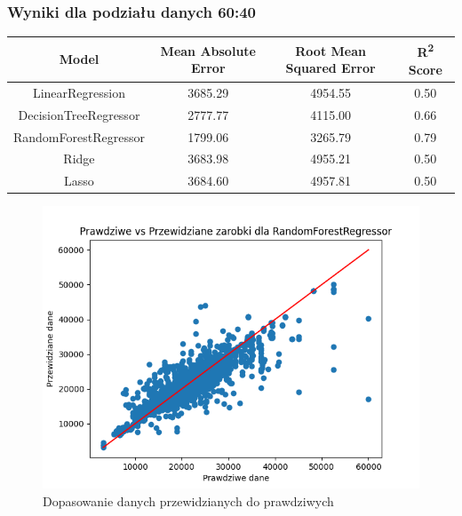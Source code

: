 \documentclass[a4paper]{article}
\begin{document}
\subsubsection{Wyniki dla podziału danych 60:40}

\begin{table}[H]
    \centering
    \begin{tabular}{|c|c|c|c|}
        \hline
        \textbf{Model}        & \textbf{Mean Absolute Error} & \textbf{Root Mean Squared Error} & \textbf{R\textsuperscript{2} Score} \\ \hline
        LinearRegression      & 3685.29                      & 4954.55                          & 0.50                                \\ \hline
        DecisionTreeRegressor & 2777.77                      & 4115.00                          & 0.66                                \\ \hline
        RandomForestRegressor & 1799.06                      & 3265.79                          & 0.79                                \\ \hline
        Ridge                 & 3683.98                      & 4955.21                          & 0.50                                \\ \hline
        Lasso                 & 3684.60                      & 4957.81                          & 0.50                                \\ \hline
    \end{tabular}
\end{table}

\begin{figure}[H]
    \centering
    \includegraphics[width=\textwidth]{../analysis/plots/wyniki/0.6&0.4/RandomForestRegressor/scatter.png}
    \caption{Dopasowanie danych przewidzianych do prawdziwych}
\end{figure}
\end{document}
